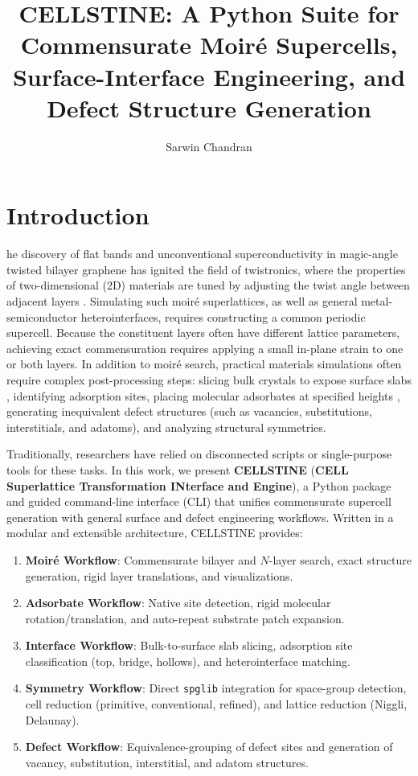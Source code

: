 \documentclass[9pt,a4paper,twoside]{tau-class/tau}
\title{CELLSTINE: A Python Suite for Commensurate Moir\'e Supercells, Surface-Interface Engineering, and Defect Structure Generation}
\author[a,1]{Sarwin Chandran}
\affil[a]{Theoretical Sciences Unit, Jawaharlal Nehru Centre for Advanced Scientific Research, Jakkur, Bangalore 560064, India}
\begin{document}
\maketitle
\thispagestyle{firststyle}
\tauabstract
\setcounter{tocdepth}{2}
\tableofcontents

\section{Introduction}
he discovery of flat bands and unconventional superconductivity in magic-angle twisted bilayer graphene \cite{cao2018unconventional, bistritzer2011moire} has ignited the field of twistronics, where the properties of two-dimensional (2D) materials are tuned by adjusting the twist angle between adjacent layers \cite{cellstineRepo}. Simulating such moir\'e superlattices, as well as general metal-semiconductor heterointerfaces, requires constructing a common periodic supercell. Because the constituent layers often have different lattice parameters, achieving exact commensuration requires applying a small in-plane strain to one or both layers. In addition to moir\'e search, practical materials simulations often require complex post-processing steps: slicing bulk crystals to expose surface slabs \cite{larsen2017ase}, identifying adsorption sites, placing molecular adsorbates at specified heights \cite{hammer2000theoretical}, generating inequivalent defect structures (such as vacancies, substitutions, interstitials, and adatoms), and analyzing structural symmetries.

Traditionally, researchers have relied on disconnected scripts or single-purpose tools for these tasks. In this work, we present \textbf{CELLSTINE} (\textbf{CELL Superlattice Transformation INterface and Engine}), a Python package and guided command-line interface (CLI) that unifies commensurate supercell generation with general surface and defect engineering workflows. Written in a modular and extensible architecture, CELLSTINE provides:
\begin{enumerate}[label=\arabic*.]
    \item \textbf{Moir\'e Workflow}: Commensurate bilayer and $N$-layer search, exact structure generation, rigid layer translations, and visualizations.
    \item \textbf{Adsorbate Workflow}: Native site detection, rigid molecular rotation/translation, and auto-repeat substrate patch expansion.
    \item \textbf{Interface Workflow}: Bulk-to-surface slab slicing, adsorption site classification (top, bridge, hollows), and heterointerface matching.
    \item \textbf{Symmetry Workflow}: Direct \texttt{spglib} integration for space-group detection, cell reduction (primitive, conventional, refined), and lattice reduction (Niggli, Delaunay).
    \item \textbf{Defect Workflow}: Equivalence-grouping of defect sites and generation of vacancy, substitution, interstitial, and adatom structures.
\end{enumerate}
\end{document}
